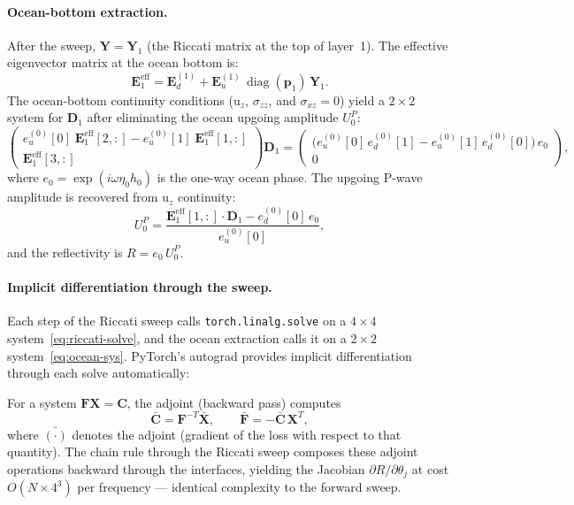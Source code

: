 \documentclass[11pt,a4paper]{article}
\theoremstyle{plain}
\theoremstyle{remark}
\begin{document}
\paragraph{Ocean-bottom extraction.}
After the sweep, $\mathbf{Y} = \mathbf{Y}_1$ (the Riccati matrix at the
top of layer~1).  The effective eigenvector matrix at the ocean bottom is:
\begin{equation}\label{eq:E1eff}
  \mathbf{E}_1^{\text{eff}}
  = \mathbf{E}_d^{(1)}
  + \mathbf{E}_u^{(1)}\,\operatorname{diag}(\mathbf{p}_1)\,\mathbf{Y}_1.
\end{equation}
The ocean-bottom continuity conditions (u$_z$, $\sigma_{zz}$, and
$\sigma_{xz} = 0$) yield a $2\times 2$ system for $\mathbf{D}_1$ after
eliminating the ocean upgoing amplitude $U_0^P$:
\begin{equation}\label{eq:ocean-sys}
  \begin{pmatrix}
    e_u^{(0)}[0]\;\mathbf{E}_1^{\text{eff}}[2,:] -
    e_u^{(0)}[1]\;\mathbf{E}_1^{\text{eff}}[1,:] \\[3pt]
    \mathbf{E}_1^{\text{eff}}[3,:]
  \end{pmatrix}
  \mathbf{D}_1
  =
  \begin{pmatrix}
    \bigl(e_u^{(0)}[0]\,e_d^{(0)}[1] - e_u^{(0)}[1]\,e_d^{(0)}[0]\bigr)\,e_0 \\
    0
  \end{pmatrix},
\end{equation}
where $e_0 = \exp(i\omega\eta_0 h_0)$ is the one-way ocean phase.
The upgoing P-wave amplitude is recovered from u$_z$ continuity:
\begin{equation}\label{eq:U0P}
  U_0^P = \frac{\mathbf{E}_1^{\text{eff}}[1,:]\cdot\mathbf{D}_1
                - e_d^{(0)}[0]\,e_0}{e_u^{(0)}[0]},
\end{equation}
and the reflectivity is $R = e_0\,U_0^P$.

\paragraph{Implicit differentiation through the sweep.}
Each step of the Riccati sweep calls
\texttt{torch.linalg.solve} on a $4\times 4$
system~\eqref{eq:riccati-solve}, and the ocean extraction calls it on a
$2\times 2$ system~\eqref{eq:ocean-sys}.  PyTorch's
autograd provides implicit differentiation through each solve
automatically:

For a system $\mathbf{F}\mathbf{X} = \mathbf{C}$, the adjoint
(backward pass) computes
\begin{equation}\label{eq:implicit-adj}
  \bar{\mathbf{C}} = \mathbf{F}^{-T}\bar{\mathbf{X}},
  \qquad
  \bar{\mathbf{F}} = -\bar{\mathbf{C}}\,\mathbf{X}^T,
\end{equation}
where $\bar{(\cdot)}$ denotes the adjoint (gradient of the loss with
respect to that quantity).  The chain rule through the Riccati sweep
composes these adjoint operations backward through the interfaces,
yielding the Jacobian $\partial R/\partial\theta_j$ at cost
$O(N \times 4^3)$ per frequency --- identical complexity to the forward
sweep.
\end{document}
